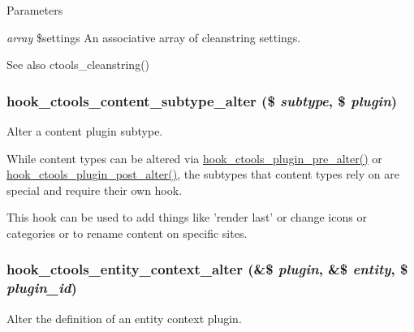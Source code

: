 \begin{DoxyParams}{Parameters}
\item[{\em array}]\$settings An associative array of cleanstring settings.\end{DoxyParams}
\begin{DoxySeeAlso}{See also}
ctools\_\-cleanstring() 
\end{DoxySeeAlso}
\hypertarget{group__hooks_ga095e4e5a15a03861b5e708e3454bf154}{
\subsubsection[{hook\_\-ctools\_\-content\_\-subtype\_\-alter}]{\setlength{\rightskip}{0pt plus 5cm}hook\_\-ctools\_\-content\_\-subtype\_\-alter (\$ {\em subtype}, \/  \$ {\em plugin})}}
\label{group__hooks_ga095e4e5a15a03861b5e708e3454bf154}
Alter a content plugin subtype.

While content types can be altered via \hyperlink{group__hooks_ga4ae530d112605c111f7bdead789ed91d}{hook\_\-ctools\_\-plugin\_\-pre\_\-alter()} or \hyperlink{group__hooks_ga2f8a7bad70a9bcb0748a13463a32d362}{hook\_\-ctools\_\-plugin\_\-post\_\-alter()}, the subtypes that content types rely on are special and require their own hook.

This hook can be used to add things like 'render last' or change icons or categories or to rename content on specific sites. \hypertarget{group__hooks_gad8e0232b98d84d2347a3cc1e26c3df09}{
\subsubsection[{hook\_\-ctools\_\-entity\_\-context\_\-alter}]{\setlength{\rightskip}{0pt plus 5cm}hook\_\-ctools\_\-entity\_\-context\_\-alter (\&\$ {\em plugin}, \/  \&\$ {\em entity}, \/  \$ {\em plugin\_\-id})}}
\label{group__hooks_gad8e0232b98d84d2347a3cc1e26c3df09}
Alter the definition of an entity context plugin.


